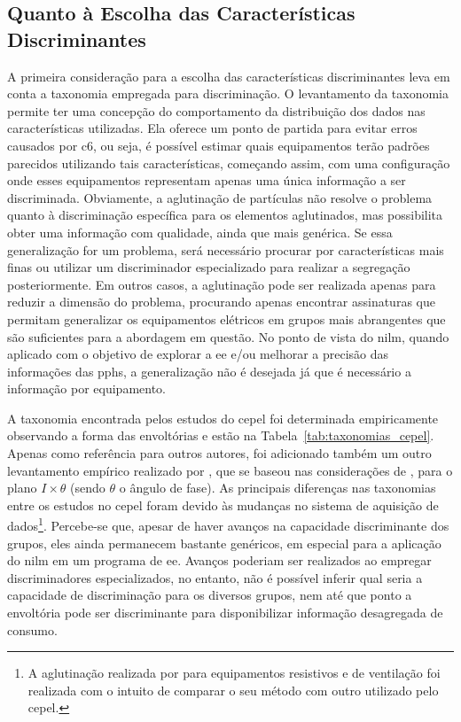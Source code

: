 \subsection{Quanto à Escolha das Características Discriminantes}%
\label{ssec:caracteristicas}

A primeira consideração para a escolha das características discriminantes leva
em conta a taxonomia empregada para discriminação. O levantamento da taxonomia
permite ter uma concepção do comportamento da distribuição dos dados nas
características utilizadas. Ela oferece um ponto de partida para evitar erros
causados por \gls{c6}, ou seja, é possível estimar quais equipamentos terão
padrões parecidos utilizando tais características, começando assim, com uma
configuração onde esses equipamentos representam apenas uma única informação a
ser discriminada. Obviamente, a aglutinação de partículas não resolve o problema
quanto à discriminação específica para os elementos aglutinados, mas possibilita
obter uma informação com qualidade, ainda que mais genérica. Se essa
generalização for um problema, será necessário procurar por características mais
finas ou utilizar um discriminador especializado para realizar a segregação
posteriormente.  Em outros casos, a aglutinação pode ser realizada apenas para
reduzir a dimensão do problema, procurando apenas encontrar assinaturas que
permitam generalizar os equipamentos elétricos em grupos mais abrangentes que
são suficientes para a abordagem em questão. No ponto de vista do \gls{nilm},
quando aplicado com o objetivo de explorar a \gls{ee} e/ou melhorar a precisão
das informações das \glspl{pph}, a generalização não é desejada já que é
necessário a informação por equipamento.

A taxonomia encontrada pelos estudos do \gls{cepel}
foi determinada empiricamente observando a forma das envoltórias e
estão na Tabela~\ref{tab:taxonomias_cepel}. Apenas como referência
para outros autores, foi adicionado também um outro levantamento
empírico realizado por \citet*{nilm_cepel_aguiar}, que se baseou nas
considerações de \cite{nilm_sultanem_1991_10}, para o plano
$I\times\theta$ (sendo $\theta$ o ângulo de fase). As principais
diferenças nas taxonomias entre os estudos no \gls{cepel} foram devido
às mudanças no sistema de aquisição de dados\footnote{A aglutinação
realizada por \citeauthor{nilm_cepel_bezerra} para equipamentos
resistivos e de ventilação foi realizada com o intuito de comparar o
seu método com outro utilizado pelo \gls{cepel}.}. Percebe-se que,
apesar de haver avanços na capacidade discriminante dos grupos, eles
ainda permanecem bastante genéricos, em especial para a aplicação do
\gls{nilm} em um programa de \gls{ee}. Avanços poderiam ser realizados
ao empregar discriminadores especializados, no entanto, não é possível
inferir qual seria a capacidade de discriminação para os diversos
grupos, nem até que ponto a envoltória pode ser discriminante para
disponibilizar informação desagregada de consumo.


